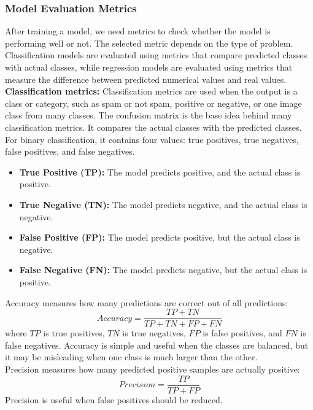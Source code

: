 \documentclass[12pt,a4paper]{report}
\begin{document}
\subsubsection{Model Evaluation Metrics ~\cite{hossin2015review}}
After training a model, we need metrics to check whether the model is performing
well or not. The selected metric depends on the type of problem. Classification
models are evaluated using metrics that compare predicted classes with actual
classes, while regression models are evaluated using metrics that measure the
difference between predicted numerical values and real values.\\

\noindent\textbf{Classification metrics:}
Classification metrics are used when the output is a class or category, such as
spam or not spam, positive or negative, or one image class from many classes. The
confusion matrix is the base idea behind many classification metrics. It compares
the actual classes with the predicted classes. For binary classification, it
contains four values: true positives, true negatives, false positives, and false
negatives.

\begin{itemize}
  \item \textbf{True Positive (TP):} The model predicts positive, and the actual
  class is positive.
  \item \textbf{True Negative (TN):} The model predicts negative, and the actual
  class is negative.
  \item \textbf{False Positive (FP):} The model predicts positive, but the actual
  class is negative.
  \item \textbf{False Negative (FN):} The model predicts negative, but the actual
  class is positive.
\end{itemize}

\noindent Accuracy measures how many predictions are correct out of all predictions:
\[
Accuracy = \frac{TP + TN}{TP + TN + FP + FN}
\]
\noindent where $TP$ is true positives, $TN$ is true negatives, $FP$ is false positives,
and $FN$ is false negatives. Accuracy is simple and useful when the classes are
balanced, but it may be misleading when one class is much larger than the other.\\
\noindent Precision measures how many predicted positive samples are actually positive:
\[
Precision = \frac{TP}{TP + FP}
\]
\noindent Precision is useful when false positives should be reduced.\\
\end{document}
